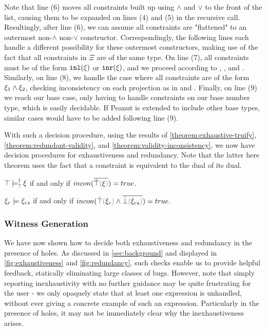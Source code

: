 Note that line (6) moves all constraints built up using $\land$ and $\lor$ to the front of the list, causing them to be expanded on lines (4) and (5) in the recursive call. Resultingly, after line (6), we can assume all constraints are "flattened" to an outermost non-$\land$ non-$\lor$ constructor. 
Correspondingly, the following lines each handle a different possibility for these outermost constructors, making use of the fact that all constraints in $\Xi$ are of the same type. On line (7), all constraints must be of the form $\mathtt{inl}(\xi)$ or $\mathtt{inr}(\xi)$, and we proceed according to \CINCInj, \CINCInl, and \CINCInr. Similarly, on line (8), we handle the case where all constraints are of the form $\xi_1 \wedge \xi_2$, checking inconsistency on each projection as in \CINCPairL and \CINCPairR. Finally, on line (9) we reach our base case, only having to handle constraints on our base number type, which is easily decidable. If Peanut is extended to include other base types, similar cases would have to be added following line (9).

With such a decision procedure, using the results of \autoref{theorem:exhaustive-truify},  \autoref{theorem:redundant-validity}, and \autoref{theorem:validity-inconsistency}, we now have decision procedures for exhaustiveness and redundancy. Note that the latter here theorem uses the fact that a constraint is equivalent to the dual of its dual.
\begin{theorem}
$\top \models_{?}^{\dag} \xi$ if and only if $incon(\cdual{\ctruify{\xi}}) = true$.
\end{theorem}
\begin{theorem}
$\xi_r \models \xi_{rs}$ if and only if $incon(\cand{\ctruify{\xi_r}}{\cdual{\cfalsify{\xi_{rs}}}})  = true$.
\end{theorem}

\subsubsection{Witness Generation}
We have now shown how to decide both exhaustiveness and redundancy in the presence of holes. As discussed in \autoref{sec:background} and displayed in \autoref{fig:exhaustiveness} and \autoref{fig:redundancy}, such checks enable us to provide helpful feedback, statically eliminating large classes of bugs. However, note that simply reporting inexhaustivity with no further guidance may be quite frustrating for the user - we only opaquely state that at least one expression is unhandled, without ever giving a concrete example of such an expression. Particularly in the presence of holes, it may not be immediately clear why the inexhaustiveness arises.

